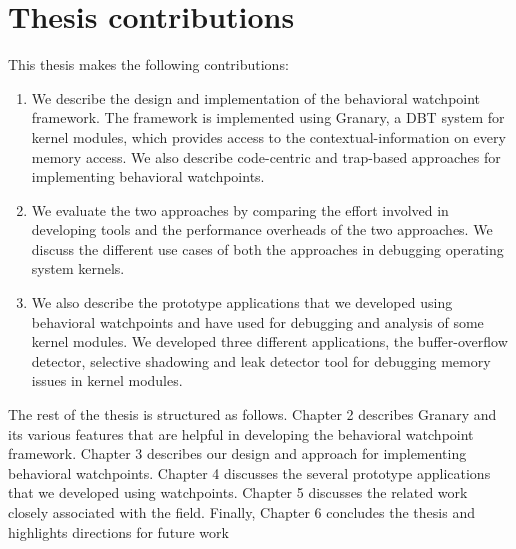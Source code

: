 \section{Thesis contributions}
This thesis makes the following contributions:
\begin{enumerate}
	\item We describe the design and implementation of the behavioral watchpoint framework. The framework is implemented using Granary, a DBT system for kernel modules, which provides access to the contextual-information on every memory access. We also describe code-centric and trap-based approaches for implementing %
	behavioral watchpoints.
	\item We evaluate the two approaches by comparing the effort involved in developing tools and the performance overheads of the two approaches. We discuss the different use cases of both the approaches in debugging operating system kernels. 
	\item We also describe the prototype applications that we developed using behavioral watchpoints and have used for debugging and analysis of some kernel modules. We developed three different applications, the buffer-overflow detector, selective shadowing and leak detector tool for debugging memory issues in kernel modules.
\end{enumerate}


The rest of the thesis is structured as follows. Chapter 2 describes Granary and its various features that are helpful in developing the behavioral watchpoint framework. Chapter 3 describes our design and approach for implementing behavioral watchpoints. Chapter 4 discusses the several prototype applications that we developed using watchpoints. Chapter 5 discusses the related work closely associated with the field. Finally, Chapter 6 concludes the thesis and highlights directions for future work



